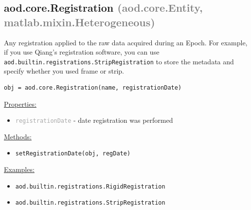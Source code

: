 \documentclass[10pt]{exam}
\newcommand\myparent[1]{\textcolor{gray}{(#1)}}
\newcommand\aodclass[1]{\textcolor{codeblue}{\texttt{#1}}}
\newcommand\aodprop[1]{\textcolor{darkgray}{\texttt{#1}}}
\newcommand\aodfcn[1]{\textcolor{darkteal}{\texttt{#1}}}
\newcommand\docheader[1]{\vspace{0.6ex}\noindent\underline{#1}\vspace{0.15ex}}
\begin{document}
	\subsection{aod.core.Registration \myparent{aod.core.Entity, matlab.mixin.Heterogeneous}}
		\noindent Any registration applied to the raw data acquired during an Epoch. For example, if you use Qiang's registration software, you can use \aodclass{aod.builtin.registrations.StripRegistration} to store the metadata and specify whether you used frame or strip.  
		
		\begin{lstlisting}[style=matlab-editor, basicstyle=\mlttfamily\footnotesize]
obj = aod.core.Registration(name, registrationDate)
		\end{lstlisting}
		\docheader{Properties:}
		\begin{itemize}
			\item \aodprop{registrationDate} - date registration was performed
		\end{itemize}
		\docheader{Methods:}
		\begin{itemize}
			\item \aodfcn{setRegistrationDate(obj, regDate)}
		\end{itemize}
		\docheader{Examples:}
		\begin{itemize}
			\item \aodclass{aod.builtin.registrations.RigidRegistration}
			\item \aodclass{aod.builtin.registrations.StripRegistration}
		\end{itemize}
\end{document}

